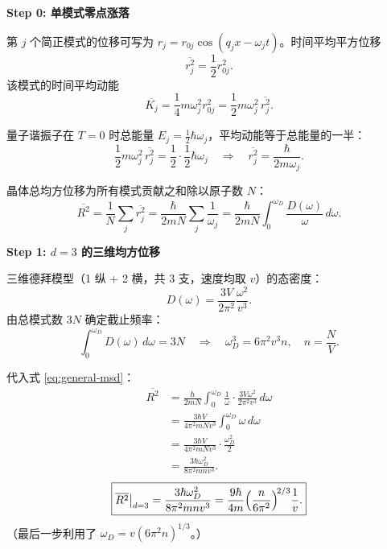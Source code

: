 \begin{derivationbox}[标准解题过程]
\textbf{Step 0: 单模式零点涨落}

第 $j$ 个简正模式的位移可写为 $r_j=r_{0j}\cos(q_jx-\omega_jt)$。时间平均平方位移
\begin{equation}
\overline{r_j^2} = \frac12 r_{0j}^2.
\end{equation}
该模式的时间平均动能
\begin{equation}
\overline{K_j} = \frac14 m\omega_j^2 r_{0j}^2 = \frac12 m\omega_j^2\,\overline{r_j^2}.
\end{equation}

量子谐振子在 $T=0$ 时总能量 $E_j=\frac12\hbar\omega_j$，平均动能等于总能量的一半：
\begin{equation}
\frac12 m\omega_j^2\,\overline{r_j^2} = \frac12\cdot\frac12\hbar\omega_j \quad\Longrightarrow\quad \overline{r_j^2} = \frac{\hbar}{2m\omega_j}.
\label{eq:single-mode-msd}
\end{equation}

晶体总均方位移为所有模式贡献之和除以原子数 $N$：
\begin{equation}
\boxed{\overline{R^2} = \frac{1}{N}\sum_j\overline{r_j^2} = \frac{\hbar}{2mN}\sum_j\frac{1}{\omega_j} = \frac{\hbar}{2mN}\int_0^{\omega_D}\frac{D(\omega)}{\omega}\,d\omega.}
\label{eq:general-msd}
\end{equation}

\textbf{Step 1: $d=3$ 的三维均方位移}

三维德拜模型（1 纵 + 2 横，共 3 支，速度均取 $v$）的态密度：
\begin{equation}
D(\omega) = \frac{3V}{2\pi^2}\frac{\omega^2}{v^3}.
\end{equation}
由总模式数 $3N$ 确定截止频率：
\begin{equation}
\int_0^{\omega_D} D(\omega)\,d\omega = 3N \quad\Longrightarrow\quad \omega_D^3 = 6\pi^2 v^3 n, \quad n=\frac{N}{V}.
\end{equation}

代入式 \eqref{eq:general-msd}：
\begin{align}
    \overline{R^2} &= \frac{\hbar}{2mN}\int_0^{\omega_D}\frac{1}{\omega}\cdot\frac{3V\omega^2}{2\pi^2v^3}\,d\omega \nonumber\\
    &= \frac{3\hbar V}{4\pi^2 mNv^3}\int_0^{\omega_D}\omega\,d\omega \nonumber\\
    &= \frac{3\hbar V}{4\pi^2 mNv^3}\cdot\frac{\omega_D^2}{2} \nonumber\\
    &= \frac{3\hbar\omega_D^2}{8\pi^2 mnv^3}.
\end{align}
\begin{equation}
\boxed{\overline{R^2}\big|_{d=3} = \frac{3\hbar\omega_D^2}{8\pi^2 mnv^3} = \frac{9\hbar}{4m}\Bigl(\frac{n}{6\pi^2}\Bigr)^{\!2/3}\frac{1}{v}.}
\label{eq:3d-msd}
\end{equation}
（最后一步利用了 $\omega_D=v(6\pi^2n)^{1/3}$。）


\end{derivationbox}
